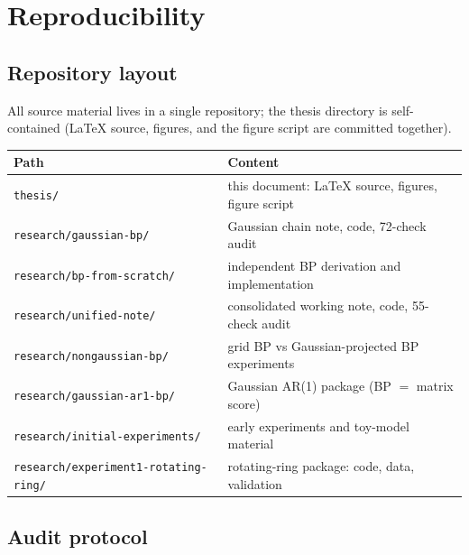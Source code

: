 \chapter{Reproducibility}\label{app:repro}

\section{Repository layout}

All source material lives in a single repository; the thesis directory is
self-contained (\LaTeX{} source, figures, and the figure script are
committed together).

\begin{center}\small
\begin{tabular}{@{}ll@{}}
\toprule
Path & Content \\
\midrule
\texttt{thesis/} & this document: \LaTeX{} source, figures, figure script \\
\texttt{research/gaussian-bp/} & Gaussian chain note, code, 72-check audit \\
\texttt{research/bp-from-scratch/} & independent BP derivation and implementation \\
\texttt{research/unified-note/} & consolidated working note, code, 55-check audit \\
\texttt{research/nongaussian-bp/} & grid BP vs Gaussian-projected BP experiments \\
\texttt{research/gaussian-ar1-bp/} & Gaussian AR(1) package (BP $=$ matrix score) \\
\texttt{research/initial-experiments/} & early experiments and toy-model material \\
\texttt{research/experiment1-rotating-ring/} & rotating-ring package: code, data, validation \\
\bottomrule
\end{tabular}
\end{center}

\section{Audit protocol}

